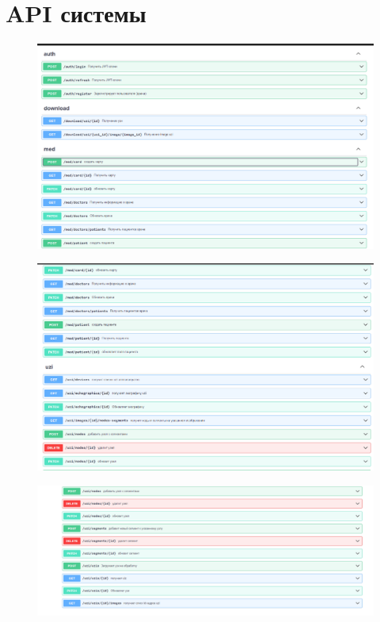\chapter{API системы}\label{app-structure}

\begin{figure}[H]%
	\begin{center}
		\includegraphics[width=.9\columnwidth]{./img/swagger/sw1.png}%
	\end{center}
	\label{pic:auth_model}%
\end{figure}
\begin{figure}[H]%
	\begin{center}
		\includegraphics[width=.9\columnwidth]{./img/swagger/sw2.png}%
	\end{center}
	\label{pic:auth_model}%
\end{figure}
\begin{figure}[H]%
	\begin{center}
		\includegraphics[width=.9\columnwidth]{./img/swagger/sw3.png}%
	\end{center}
	\label{pic:auth_model}%
\end{figure}


